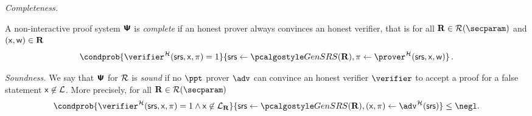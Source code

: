 \documentclass[10pt]{llncs}
\newcommand{\ourpar}[1] {\smallskip\noindent\emph{#1}}
\begin{document}
\ourpar{Completeness.}

  A non-interactive proof system $\bm{\mathsf{\Psi}}$ is
  \emph{complete} if an honest prover always convinces an honest verifier, that
  is for all $\REL \in \RELGEN(\secparam)$ and $(\mathsf{x}, \mathsf{w}) \in \mathbf{R}$
	\[
		\condprob{\verifier^\ro (\srs, \inp, \zkproof) = 1} {\srs \gets \kgen(\REL),
      \zkproof \gets \prover^\ro (\srs, \inp, \wit)}\,.
	\]

\ourpar{Soundness.}
    We say that $\bm{\mathsf{\Psi}}$ for $\mathcal{R}$ is \emph{sound} if no
  $\ppt$ prover $\adv$ can convince an honest verifier $\verifier$ to accept a
  proof for a false statement $\mathsf{x} \not\in\mathcal{L}$. More precisely, for
  all $\REL \in \RELGEN(\secparam)$
	\[
    \condprob{ \verifier^\ro (\srs, \inp, \zkproof) = 1 \land \inp \not\in
      \LANG_\REL}{\srs \gets \kgen(\REL), (\inp, \zkproof) \gets \adv^\ro(\srs)} \leq
    \negl.
	\]

\fi
 
\end{document}
